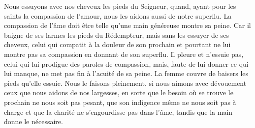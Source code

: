 Nous essuyons avec nos cheveux les pieds du Seigneur,
	quand, ayant pour les saints la compassion de l'amour,
	nous les aidons aussi de notre superflu.
La compassion de l'âme doit être telle qu'une main généreuse montre sa peine.
Car il baigne de ses larmes les pieds du Rédempteur,
		mais sans les essuyer de ses cheveux,
	celui qui compatit à la douleur de son prochain
		et pourtant ne lui montre pas sa compassion en donnant de son superflu.
Il pleure et n'essuie pas, celui qui lui prodigue des paroles de compassion,
	mais, faute de lui donner ce qui lui manque, ne met pas fin à l'acuité de sa peine.
La femme couvre de baisers les pieds qu'elle essuie.
Nous le faisons pleinement,
	si nous aimons avec dévouement ceux que nous aidons de nos largesses,
	en sorte que le besoin où se trouve le prochain ne nous soit pas pesant,
	que son indigence même ne nous soit pas à charge
	et que la charité ne s'engourdisse pas dans l'âme,
		tandis que la main donne le nécessaire.
